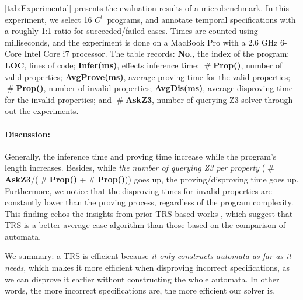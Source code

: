 \documentclass[acmsmall,10pt,review]{acmart}
\newcommand{\cmark}{\ding{51}}%
\newcommand{\xmark}{\ding{55}}%
\newcommand{\code}[1]{{\tt{\ensuremath{\m{#1}}}}}
\newcommand{\m}{\mathit}
\newcommand{\mysharp}{{\mathrel{\texttt{\#}}}}
\newcommand{\timedL}{\code{C^{t}}}
\begin{document}
{\autoref{tab:Experimental} presents the evaluation results of a microbenchmark. %
In this experiment, we select 16 \timedL\ programs, and  annotate temporal specifications
with a roughly 1:1 ratio for succeeded/failed cases. 
Times are counted using milliseconds, and the experiment is done on 
a MacBook Pro with a 2.6 GHz 6-Core Intel Core i7 processor. 
The table records: 
\textbf{No.}, the index of the program;
\textbf{LOC}, lines of code; 
\textbf{Infer(ms)}, effects inference time; 
\textbf{$\mysharp$Prop(\cmark)}, number of valid properties; 
\textbf{Avg\text{-}Prove(ms)}, average proving time for the valid properties;
\textbf{$\mysharp$Prop(\xmark)}, number of invalid properties; 
\textbf{Avg\text{-}Dis(ms)}, average disproving time for the invalid properties; and 
\textbf{$\mysharp$AskZ3}, number of querying Z3 solver through out the experiments.


\paragraph{Discussion:} Generally, the inference time and proving 
time increase while the program's length increases. 
Besides, while \emph{the number of querying Z3 per property} (\textbf{$\mysharp$AskZ3}/(\textbf{$\mysharp$Prop(\cmark)} +\textbf{$\mysharp$Prop(\xmark)})) 
goes up, the 
proving/disproving time goes up.
Furthermore, we notice that 
the disproving
times for invalid properties are constantly lower than the proving process, 
regardless of the program complexity. This finding echos the 
insights from prior TRS-based works \cite{DBLP:conf/icfem/SongC20,DBLP:journals/tcs/AntimirovM95,DBLP:journals/ijfcs/AlmeidaMR09,DBLP:conf/fsttcs/KeilT14,DBLP:journals/jcss/Hovland12}, 
which suggest that TRS is a better average-case algorithm than 
those based on the comparison of automata.  

We summary: a TRS is efficient because 
\emph{it only constructs automata as far as it needs}, which makes 
it more efficient when disproving incorrect specifications, as we can 
disprove it earlier without constructing the whole automata. In other 
words, the more incorrect specifications are, the more efficient our solver is.


}
\end{document}
